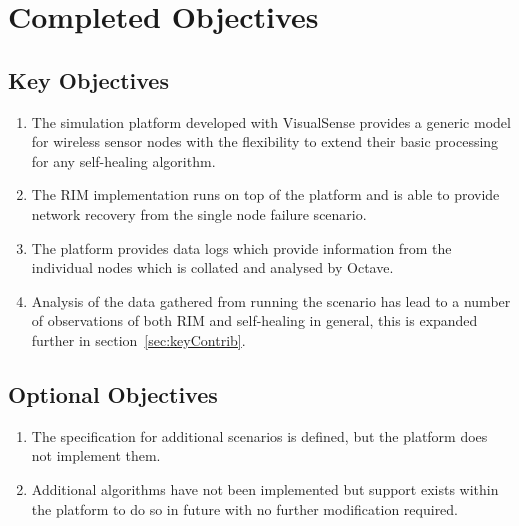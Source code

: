 \documentclass[authoryearcitations]{UoYCSproject}
\begin{document}
\section{Completed Objectives}

\subsection{Key Objectives}
\begin{enumerate}
\item The simulation platform developed with VisualSense provides a generic model for wireless sensor nodes with the flexibility to extend their basic processing for any self-healing algorithm.
\item The RIM implementation runs on top of the platform and is able to provide network recovery from the single node failure scenario.
\item The platform provides data logs which provide information from the individual nodes which is collated and analysed by Octave.
\item Analysis of the data gathered from running the scenario has lead to a number of observations of both RIM and self-healing in general, this is expanded further in section~\ref{sec:keyContrib}.
\end{enumerate}

\subsection{Optional Objectives}
\begin{enumerate}
\item The specification for additional scenarios is defined, but the platform does not implement them.
\item Additional algorithms have not been implemented but support exists within the platform to do so in future with no further modification required.
\end{enumerate}
\end{document}
